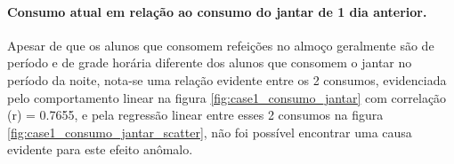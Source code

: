                \paragraph{Consumo atual em relação ao consumo do jantar de 1 dia anterior.}
                
                    Apesar de que os alunos que consomem refeições no almoço geralmente são de período e de grade horária diferente dos alunos que consomem o jantar no período da noite, nota-se uma relação evidente entre os 2 consumos, evidenciada pelo comportamento linear na figura \ref{fig:case1_consumo_jantar} com correlação (r) = 0.7655, e pela regressão linear entre esses 2 consumos na figura  \ref{fig:case1_consumo_jantar_scatter}, não foi possível encontrar uma causa evidente para este efeito anômalo.
                    
